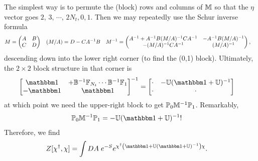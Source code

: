 The simplest way is to permute the (block) rows and columns of $\mathbb{M}$ so that the $\eta$ vector goes $2,\, 3,\, \cdots,\, 2N_t, 0, 1$.
Then we may repeatedly use the Schur inverse formula
\begin{align}
	M
	&=
	\begin{pmatrix} A & B \\ C & D \end{pmatrix}
	&
	(M/A)
	&=
	D-CA^{-1} B
	&
	M^{-1}
	&=
	\begin{pmatrix}
		A^{-1} + A^{-1} B (M/A)^{-1} C A^{-1} & - A^{-1} B (M/A)^{-1} \\
		- (M/A)^{-1} C A^{-1} & (M/A)^{-1}
	\end{pmatrix},
\end{align}
descending down into the lower right corner (to find the (0,1) block).
Ultimately, the $2\times2$ block structure in that corner is
\begin{align}
	\begin{bmatrix}
		\one & + \BB\inverse \FF_{N_t} \cdots \BB\inverse \FF_1
		\\
		-\one & \one
	\end{bmatrix}^{-1}
	&=
	\begin{bmatrix}
		\cdot & - \UU (\one + \UU)\inverse \\
		\cdot & \cdot
	\end{bmatrix}
\end{align}
at which point we need the upper-right block to get $\mathbb{P}_0 \mathbb{M}^{-1} \mathbb{P}_1$.
Remarkably,
\begin{align}
	\PP_0 \MM\inverse \PP_1 &= -\UU (\one+\UU)\inverse!
\end{align}
Therefore, we find
\begin{align}
	Z[\chi\adjoint, \chi]
	&=
	\int DA\; e^{-S }
		e^{ \chi\adjoint \left(\one + \UU (\one+\UU)\inverse\right)\chi }.
\end{align}

